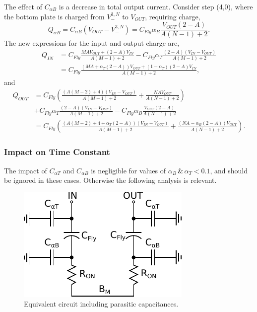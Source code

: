 \documentclass[conference]{article}
\begin{document}
 	The effect of $C_{\alpha B}$ is a decrease in total output current. Consider step (4,0), where the bottom plate is charged from $V_-^{3,N}$ to $V_{OUT}$, requiring charge,
 	\begin{equation}
 	Q_{\alpha B} = C_{\alpha B}(V_{OUT} - V_{-}^{3,N}) = C_{Fly}\alpha_B\frac{V_{OUT}(2-A)}{A(N-1) + 2}.
 	\end{equation}
 	The new expressions for the input and output charge are,
 	\begin{equation}
 	\begin{split}
 	Q_{IN} &= C_{Fly}\frac{MAV_{OUT} + (2-A)V_{IN}}{A(M-1) + 2} - C_{Fly}\alpha_T\frac{(2 - A)(V_{IN} - V_{OUT})}{A(M-1) + 2}\\
 	&= C_{Fly}\frac{\left(MA + \alpha_T(2 - A)\right)V_{OUT} + (1-\alpha_T)(2-A)V_{IN}}{A(M-1) + 2},
 	\end{split}
 	\end{equation}
 	and 
 	\begin{equation}
 	\begin{split}
 	Q_{OUT} &= C_{Fly}\left(\frac{(A(M-2) + 4)(V_{IN} - V_{OUT})}{A(M-1) + 2} + \frac{NAV_{OUT}}{A(N-1) + 2}\right)\\ 
 	&+ C_{Fly}\alpha_T\frac{(2 - A)(V_{IN} - V_{OUT})}{A(M-1) + 2} - C_{Fly}\alpha_B \frac{V_{OUT}(2-A)}{A(N-1) + 2}\\
 	&= C_{Fly}\left(\frac{(A(M-2) + 4 + \alpha_T(2-A))(V_{IN} - V_{OUT})}{A(M-1) + 2} + \frac{\left(NA - \alpha_B(2-A)\right)V_{OUT}}{A(N-1) + 2}\right).
 	\end{split}
 	\end{equation}
 	
 	\subsubsection{Impact on Time Constant}
 	The impact of $C_{\alpha T}$ and $C_{\alpha B}$ is negligible for values of $\alpha_B\, \& \,\alpha_T < 0.1$, and should be ignored in these cases. Otherwise the following analysis is relevant.
 	
 	\begin{figure}
 		\centering
 		\includegraphics{Figures/step2_EqCPar.pdf}
 		\caption{Equivalent circuit including parasitic capacitances.}
 		\label{fig:circPar}
 	\end{figure}
 	
\end{document}

